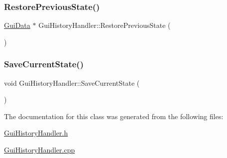 \mbox{\label{class_gui_history_handler_a7c5468c285bc60e8d16701155803be44}} 
\subsubsection{\texorpdfstring{RestorePreviousState()}{RestorePreviousState()}}
{\footnotesize\ttfamily \mbox{\hyperlink{class_gui_data}{Gui\+Data}} $\ast$ Gui\+History\+Handler\+::\+Restore\+Previous\+State (\begin{DoxyParamCaption}{ }\end{DoxyParamCaption})}

\mbox{\label{class_gui_history_handler_a238126468501d7d4add2402895569517}} 
\subsubsection{\texorpdfstring{SaveCurrentState()}{SaveCurrentState()}}
{\footnotesize\ttfamily void Gui\+History\+Handler\+::\+Save\+Current\+State (\begin{DoxyParamCaption}{ }\end{DoxyParamCaption})}



The documentation for this class was generated from the following files\+:\begin{DoxyCompactItemize}
\item 
\mbox{\hyperlink{_gui_history_handler_8h}{Gui\+History\+Handler.\+h}}\item 
\mbox{\hyperlink{_gui_history_handler_8cpp}{Gui\+History\+Handler.\+cpp}}\end{DoxyCompactItemize}
